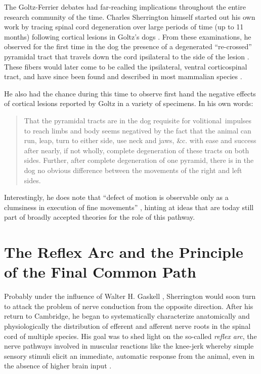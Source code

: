 The Goltz-Ferrier debates had far-reaching implications throughout the entire research community of the time. Charles Sherrington himself started out his own work by tracing spinal cord degeneration over large periods of time (up to 11 months) following cortical lesions in Goltz's dogs \cite{Langley1884,Sherrington1885}. From these examinations, he observed for the first time in the dog the presence of a degenerated ``re-crossed'' pyramidal tract that travels down the cord ipsilateral to the side of the lesion \cite{Sherrington1885}. These fibers would later come to be called the ipsilateral, ventral corticospinal tract, and have since been found and described in most mammalian species \cite{Kuypers1981,Brosamle2000,Lacroix2004}.

He also had the chance during this time to observe first hand the negative effects of cortical lesions reported by Goltz in a variety of specimens. In his own words:

\blockquote[{\protect\cite[p.189]{Sherrington1885}}]{That the pyramidal tracts are in the dog requisite for volitional~impulses to reach limbs and body seems negatived by the fact that the animal can run, leap, turn to either side, use neck and jaws, \&c. with ease and success after nearly, if not wholly, complete degeneration of these tracts on both sides. Further, after complete degeneration of one pyramid, there is in the dog no obvious difference between the movements of the right and left sides.}

Interestingly, he does note that \enquote{defect of motion is observable only as a clumsiness in execution of fine movements} \cite{Sherrington1885}, hinting at ideas that are today still part of broadly accepted theories for the role of this pathway.

\section{The Reflex Arc and the Principle of the Final Common Path}

Probably under the influence of Walter H. Gaskell \cite{Molnar2010}, Sherrington would soon turn to attack the problem of nerve conduction from the opposite direction. After his return to Cambridge, he began to systematically characterize anatomically and physiologically the distribution of efferent \cite{Sherrington1892} and afferent \cite{Sherrington1893a} nerve roots in the spinal cord of multiple species. His goal was to shed light on the so-called \emph{reflex arc}, the nerve pathways involved in muscular reactions like the knee-jerk whereby simple sensory stimuli elicit an immediate, automatic response from the animal, even in the absence of higher brain input \cite{Sherrington1893b}.

